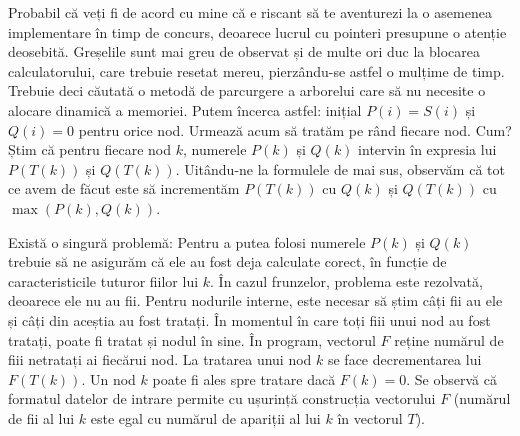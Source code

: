 
Probabil că veți fi de acord cu mine că e riscant să te aventurezi la o
asemenea implementare în timp de concurs, deoarece lucrul cu pointeri
presupune o atenție deosebită. Greșelile sunt mai greu de observat și de multe
ori duc la blocarea calculatorului, care trebuie resetat mereu, pierzându-se
astfel o mulțime de timp. Trebuie deci căutată o metodă de parcurgere a
arborelui care să nu necesite o alocare dinamică a memoriei. Putem încerca
astfel: inițial $P(i)=S(i)$ și $Q(i)=0$ pentru orice nod. Urmează acum să
tratăm pe rând fiecare nod. Cum? Știm că pentru fiecare nod $k$, numerele
$P(k)$ și $Q(k)$ intervin în expresia lui $P(T(k))$ și $Q(T(k))$. Uitându-ne
la formulele de mai sus, observăm că tot ce avem de făcut este să incrementăm
$P(T(k))$ cu $Q(k)$ și $Q(T(k))$ cu $\max(P(k), Q(k))$.

Există o singură problemă: Pentru a putea folosi numerele $P(k)$ și $Q(k)$
trebuie să ne asigurăm că ele au fost deja calculate corect, în funcție de
caracteristicile tuturor fiilor lui $k$. În cazul frunzelor, problema este
rezolvată, deoarece ele nu au fii. Pentru nodurile interne, este necesar să
știm câți fii au ele și câți din aceștia au fost tratați. În momentul în care
toți fiii unui nod au fost tratați, poate fi tratat și nodul în sine. În
program, vectorul $F$ reține numărul de fiii netratați ai fiecărui nod. La
tratarea unui nod $k$ se face decrementarea lui $F(T(k))$. Un nod $k$ poate fi
ales spre tratare dacă $F(k)=0$. Se observă că formatul datelor de intrare
permite cu ușurință construcția vectorului $F$ (numărul de fii al lui $k$ este
egal cu numărul de apariții al lui $k$ în vectorul $T$).

